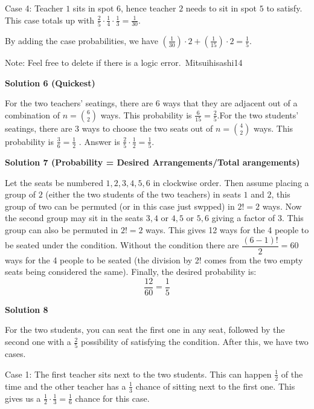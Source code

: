 \begin{enumerate}
 Case 4: Teacher $1$ sits in spot $6$, hence teacher $2$ needs to sit in spot $5$ to satisfy. This case totals up with $\frac{2}{5} \cdot \frac{1}{4} \cdot \frac{1}{3} = \frac{1}{30}$.

 By adding the case probabilities, we have $(\frac{1}{30})\cdot 2 + (\frac{1}{15}) \cdot 2 = \boxed{\frac{1}{5}}$.

 Note: Feel free to delete if there is a logic error.~Mitsuihisashi14

 



\textbf{Solution 6 (Quickest)}

For the two teachers' seatings, there are $6$ ways that they are adjacent out of a combination of $n = \binom{6}{2}$ ways. This probability is $\frac{6}{15} = \frac{2}{5}$.For the two students' seatings, there are $3$ ways to choose the two seats out of $n = \binom{4}{2}$ ways. This probability is $\frac{3}{6} = \frac{1}{2}$ . Answer is $\frac{2}{5} \cdot \frac{1}{2} = \boxed{\frac{1}{5}}$.

 



\textbf{Solution 7 (Probability = Desired Arrangements/Total arangements)}

Let the seats be numbered $1,2,3,4,5,6$ in clockwise order. Then assume placing a group of $2$ (either the two students of the two teachers) in seats $1$ and $2$, this group of two can be permuted (or in this case just swpped) in $2!=2$ ways. Now the second group may sit in the seats $3,4$ or $4,5$ or $5,6$ giving a factor of $3$. This group can also be permuted in $2!=2$ ways. This gives 12 ways for the 4 people to be seated under the condition. Without the condition there are $\dfrac{(6-1)!}{2}=60$ ways for the 4 people to be seated (the division by 2! comes from the two empty seats being considered the same). Finally, the desired probability is:
 \[\frac{12}{60}=\boxed{\frac{1}{5}}\]




\textbf{Solution 8}

For the two students, you can seat the first one in any seat, followed by the second one with a $\frac{2}{5}$ possibility of satisfying the condition. After this, we have two cases.

 Case 1: The first teacher sits next to the two students. This can happen $\frac{1}{2}$ of the time and the other teacher has a $\frac{1}{3}$ chance of sitting next to the first one. This gives us a $\frac{1}{2} \cdot \frac{1}{3} = \frac{1}{6}$ chance for this case.


\end{enumerate}
